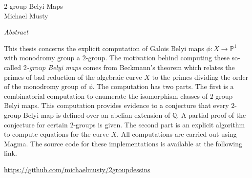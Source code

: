 \documentclass[12pt]{article}
\begin{document}
\thispagestyle{empty}
\begin{center}
 \Large $2$-group Belyi Maps\\
\large Michael Musty
\bigskip

\normalsize \textit{Abstract}
\end{center}
This thesis concerns the explicit computation
of Galois Belyi maps
$\phi\colon X\to\mathbb{P}^1$
with monodromy group
a $2$-group.
The motivation behind computing
these so-called
\emph{
$2$-group Belyi maps
}
comes from
Beckmann's theorem
which relates the primes of bad
reduction of the algebraic curve
$X$ to the primes
dividing the
order of the
monodromy group of $\phi$.
The computation has two parts.
The first is a combinatorial computation
to enumerate the isomorphism classes
of $2$-group Belyi maps.
This computation provides evidence to
a conjecture that every $2$-group
Belyi map is defined over an abelian
extension of $\mathbb{Q}$.
A partial proof of the
conjecture for certain $2$-groups is given.
The second part is an explicit algorithm
to compute equations for the curve
$X$.
All computations are carried out using
\textsf{Magma}.
The source code
for these implementations
is available at the following link.
\begin{center}
  \url{https://github.com/michaelmusty/2groupdessins}
\end{center}

% 
% 
\end{document}
